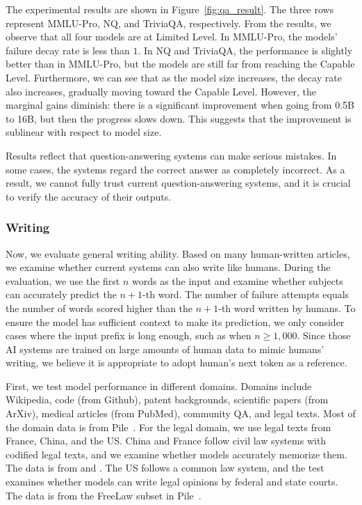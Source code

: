 The experimental results are shown in Figure~\ref{fig:qa_result}. The three rows represent MMLU-Pro, NQ, and TriviaQA, respectively. From the results, we observe that all four models are at Limited Level. In MMLU-Pro, the models' failure decay rate is less than $1$. In NQ and TriviaQA, the performance is slightly better than in MMLU-Pro, but the models are still far from reaching the Capable Level. Furthermore, we can see that as the model size increases, the decay rate also increases, gradually moving toward the Capable Level. However, the marginal gains diminish: there is a significant improvement when going from 0.5B to 16B, but then the progress slows down. This suggests that the improvement is sublinear with respect to model size.

Results reflect that question-answering systems can make serious mistakes. In some cases, the systems regard the correct answer as completely incorrect. As a result, we cannot fully trust current question-answering systems, and it is crucial to verify the accuracy of their outputs.


\subsubsection{Writing}




Now, we evaluate general writing ability. Based on many human-written articles, we examine whether current systems can also write like humans. During the evaluation, we use the first $n$ words as the input and examine whether subjects can accurately predict the $n+1$-th word. The number of failure attempts equals the number of words scored higher than the $n+1$-th word written by humans.
To ensure the model has sufficient context to make its prediction, we only consider cases where the input prefix is long enough, such as when $n \geq 1,000$. Since those AI systems are trained on large amounts of human data to mimic humans' writing, we believe it is appropriate to adopt human's next token as a reference. 


First, we test model performance in different domains. Domains include Wikipedia, code (from Github), patent backgrounds, scientific papers (from ArXiv), medical articles (from PubMed), community QA, and legal texts. Most of the domain data is from Pile~\citep{gao2020pile}. For the legal domain, we use legal texts from France, China, and the US. China and France follow civil law systems with codified legal texts, and we examine whether models accurately memorize them. The data is from \citet{HFforLegal2024} and \citet{wang2023chinese}.
The US follows a common law system, and the test examines whether models can write legal opinions by federal and state courts. The data is from the FreeLaw subset in Pile~\citep{gao2020pile}.
  

